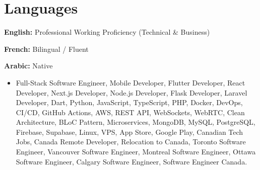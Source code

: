 \documentclass[letterpaper,10pt]{article}
\newenvironment{resume_list}{
  \vspace{-7pt}
  \begin{itemize}[itemsep=-2pt, parsep=1pt, leftmargin=30pt]
}{
  \end{itemize}
}
\begin{document}
\section{Languages}
\begin{resume_list}
  \item \textbf{English:} Professional Working Proficiency (Technical \& Business)
  \item \textbf{French:} Bilingual / Fluent
  \item \textbf{Arabic:} Native
\end{resume_list}

\vspace{2pt}
{\scriptsize
\color{hiddenText}
\begin{itemize}[leftmargin=0.1cm, itemsep=0.1pt, topsep=0pt]
    \item Full-Stack Software Engineer, Mobile Developer, Flutter Developer, React Developer, Next.js Developer, Node.js Developer, Flask Developer, Laravel Developer, Dart, Python, JavaScript, TypeScript, PHP, Docker, DevOps, CI/CD, GitHub Actions, AWS, REST API, WebSockets, WebRTC, Clean Architecture, BLoC Pattern, Microservices, MongoDB, MySQL, PostgreSQL, Firebase, Supabase, Linux, VPS, App Store, Google Play, Canadian Tech Jobs, Canada Remote Developer, Relocation to Canada, Toronto Software Engineer, Vancouver Software Engineer, Montreal Software Engineer, Ottawa Software Engineer, Calgary Software Engineer, Software Engineer Canada.
\end{itemize}
}
\end{document}
